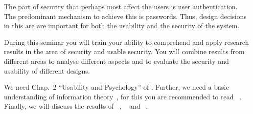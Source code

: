 The part of security that perhaps most affect the users is user authentication.
The predominant mechanism to achieve this is passwords.
Thus, design decisions in this are are important for both the usability and the 
security of the system.

During this seminar you will train your ability to comprehend and apply 
research results in the area of security and usable security.
You will combine results from different areas to analyse different aspects and 
to evaluate the security and usability of different designs.

We need Chap.~2 \enquote{Usability and Psychology} of \cite{Anderson2008sea}.
Further, we need a basic understanding of information 
theory~\cite{Shannon1948amt}, for this you are recommended to read 
~\cite{Ueltschi2013se}.
Finally, we will discuss the results of 
~\cite{Komanduri2011opa},
~\cite{kelley2012guess} and 
~\cite{Komanduri2014can}.
